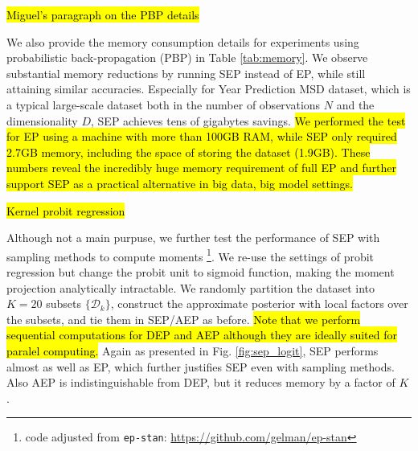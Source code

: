 \documentclass{article} %
\begin{document}
\hl{Miguel's paragraph on the PBP details}

We also provide the memory consumption details for experiments using probabilistic back-propagation (PBP) in Table \ref{tab:memory}. We observe substantial memory reductions by running SEP instead of EP, while still attaining similar accuracies. Especially for Year Prediction MSD dataset, which is a typical large-scale dataset both in the number of observations $N$ and the dimensionality $D$, SEP achieves tens of gigabytes savings. \hl{We performed the test for EP using a machine with more than 100GB RAM, while SEP only required 2.7GB memory, including the space of storing the dataset (1.9GB). These numbers reveal the incredibly huge memory requirement of full EP and further support SEP as a practical alternative in big data, big model settings.}

\hl{Kernel probit regression}

Although not a main purpuse, we further test the performance of SEP with sampling methods to compute moments \footnote{code adjusted from \texttt{ep-stan}: \url{https://github.com/gelman/ep-stan}}. We re-use the settings of probit regression but change the probit unit to sigmoid function, making the moment projection analytically intractable. We randomly partition the dataset into $K = 20$ subsets $\{\mathcal{D}_k\}$, construct the approximate posterior with local factors over the subsets, and tie them in SEP/AEP as before. \hl{Note that we perform sequential computations for DEP and AEP although they are ideally suited for paralel computing.} Again as presented in Fig. \ref{fig:sep_logit}, SEP performs almost as well as EP, which further justifies SEP even with sampling methods. Also AEP is indistinguishable from DEP, but it reduces memory by a factor of $K$.
\end{document}

